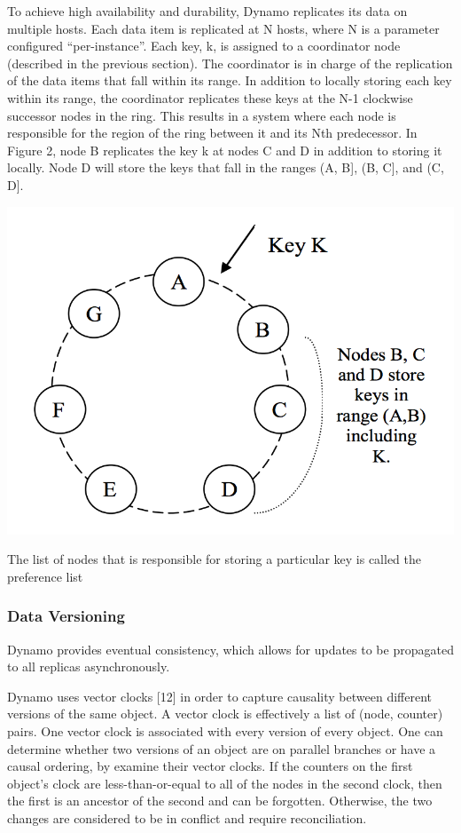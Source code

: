 To achieve high availability and durability, Dynamo replicates its
data on multiple hosts. Each data item is replicated at N hosts,
where N is a parameter configured “per-instance”. Each key, k, is
assigned to a coordinator node (described in the previous section).
The coordinator is in charge of the replication of the data items
that fall within its range. In addition to locally storing each key
within its range, the coordinator replicates these keys at the N-1
clockwise successor nodes in the ring. This results in a system
where each node is responsible for the region of the ring between
it and its Nth predecessor. In Figure 2, node B replicates the key k
at nodes C and D in addition to storing it locally. Node D will
store the keys that fall in the ranges (A, B], (B, C], and (C, D]. 

\includegraphics[width=0.5\linewidth]{img/dynamo.png}

The list of nodes that is responsible for storing a particular key is
called the preference list

\subsubsection{Data Versioning}

Dynamo provides eventual consistency, which allows for updates
to be propagated to all replicas asynchronously. 

Dynamo uses vector clocks [12] in order to capture causality
between different versions of the same object. A vector clock is
effectively a list of (node, counter) pairs. One vector clock is
associated with every version of every object. One can determine
whether two versions of an object are on parallel branches or have
a causal ordering, by examine their vector clocks. If the counters
on the first object’s clock are less-than-or-equal to all of the nodes
in the second clock, then the first is an ancestor of the second and
can be forgotten. Otherwise, the two changes are considered to be
in conflict and require reconciliation. 

